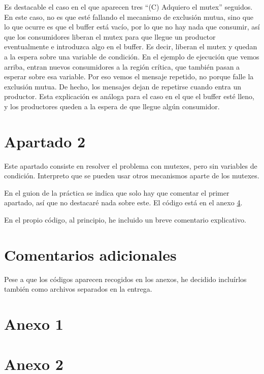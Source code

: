\documentclass[a4paper]{article}
\begin{document}
Es destacable el caso en el que aparecen tres ``(C) Adquiero el mutex'' seguidos. En este caso, no es que esté fallando el mecanismo de exclusión mutua, sino que lo que ocurre es que el buffer está vacío, por lo que no hay nada que consumir, así que los consumidores liberan el mutex para que llegue un productor eventualmente e introduzca algo en el buffer. Es decir, liberan el mutex y quedan a la espera sobre una variable de condición. En el ejemplo de ejecución que vemos arriba, entran nuevos consumidores a la región crítica, que también pasan a esperar sobre esa variable. Por eso vemos el mensaje repetido, no porque falle la exclusión mutua. De hecho, los mensajes dejan de repetirse cuando entra un productor. Esta explicación es análoga para el caso en el que el buffer esté lleno, y los productores queden a la espera de que llegue algún consumidor.

\section{Apartado 2}

Este apartado consiste en resolver el problema con mutexes, pero sin variables de condición. Interpreto que se pueden usar otros mecanismos aparte de los mutexes.

En el guion de la práctica se indica que solo hay que comentar el primer apartado, así que no destacaré nada sobre este. El código está en el anexo \ref{anexo2}.

En el propio código, al principio, he incluido un breve comentario explicativo.

\section{Comentarios adicionales}

Pese a que los códigos aparecen recogidos en los anexos, he decidido incluírlos también como archivos separados en la entrega.
    
\begin{appendices} 
\section{\LARGE \textbf{Anexo 1}}\label{anexo1}

    
\section{\LARGE \textbf{Anexo 2}}\label{anexo2}

    
\end{appendices}
\end{document}
